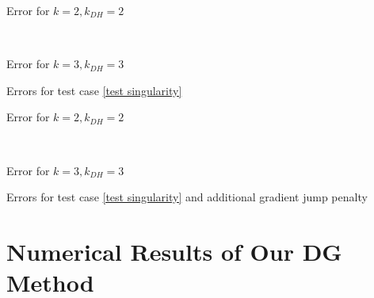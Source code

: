 \begin{table}[H]
	\begin{subtable}[b]{0.45\textwidth}
		\centering
    	\caption{Error for $k=2, k_{DH}=2$}
   \end{subtable}
   ~
	\begin{subtable}[b]{0.45\textwidth}
		\centering
	\caption{Error for $k=3, k_{DH}=3$}
	\end{subtable}
	\caption{Errors for test case \ref{test singularity}}
	\label{tab: l2 errors test 3}
\end{table}


\begin{table}[H]
	\begin{subtable}[b]{0.45\textwidth}
		\centering
		\pgfplotstabletypeset[
		columns={iterations, l2error, h1error,N},
		    every row 0 column 0/.style={set content=init},
		]{\MAThreeJumpdegTwoTwo}
    	\caption{Error for $k=2, k_{DH}=2$}
   \end{subtable}
   ~
	\begin{subtable}[b]{0.45\textwidth}
		\centering
		\pgfplotstabletypeset[columns={iterations, l2error, h1error,N},
		    every row 0 column 0/.style={set content=init},
		]{\MAThreeJumpdegThreeThree}
	\caption{Error for $k=3, k_{DH}=3$}
	\end{subtable}
	\caption{Errors for test case \ref{test singularity} and additional gradient jump penalty}
	\label{tab: l2 errors test 3 jump}
\end{table}




\newpage

\section{Numerical Results of Our DG Method}

